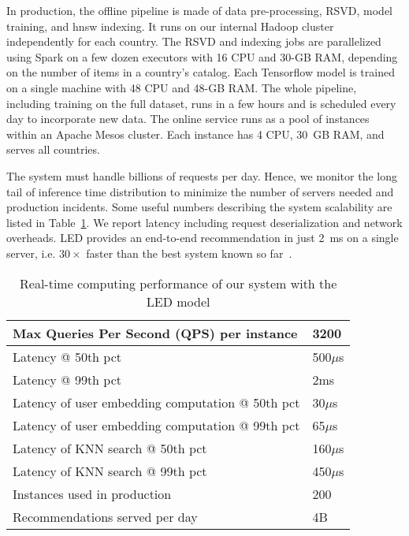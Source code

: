 \documentclass[sigconf]{acmart}
\begin{document}
In production, the offline pipeline is made of data pre-processing, RSVD, model training, and hnsw indexing. It runs on our internal Hadoop cluster independently for each country.
The RSVD and indexing jobs are parallelized using Spark on a few dozen executors with 16 CPU and 30-GB RAM, depending on the number of items in a country's catalog. Each Tensorflow model is trained on a single machine with 48 CPU and 48-GB RAM.
The whole pipeline, including training on the full dataset, runs in a few hours and is scheduled every day to incorporate new data. The online service runs as a pool of instances within an Apache Mesos cluster. Each instance has 4 CPU, 30~GB RAM, and serves all countries. 



The system must handle billions of requests per day. Hence, we monitor the long tail of inference time distribution to minimize the number of servers needed and production incidents. Some useful numbers describing the system scalability are listed in Table~\ref{table:system-numbers}. We report latency including request deserialization and network overheads. LED provides an end-to-end recommendation in just 2~ms on a single server, i.e. $30\times$ faster than the best system known so far~\cite{pixie-pinterest-www-2018}.

\begin{table}[h]
\centering
\caption{Real-time computing performance of our system with the LED model}
\begin{tabularx}{.46\textwidth}{|X|l|}
  \hline
    Max Queries Per Second (QPS) per instance & 3200 \\
  \hline
    Latency @ 50th pct & 500$\mu$s \\
    Latency @ 99th pct & 2ms \\
  \hline
    Latency of user embedding computation @ 50th pct & 30$\mu$s \\
    Latency of user embedding computation @ 99th pct & 65$\mu$s \\
  \hline
    Latency of KNN search @ 50th pct & 160$\mu$s \\
    Latency of KNN search @ 99th pct & 450$\mu$s \\
  \hline
    Instances used in production & 200 \\
  \hline
    Recommendations served per day & 4B \\
  \hline
    \end{tabularx}
\label{table:system-numbers}
\end{table} 
\end{document}
